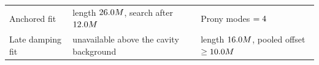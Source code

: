 \documentclass[
  aps,
  prd,
  reprint,
  superscriptaddress,
  nofootinbib,
  longbibliography
]{revtex4-2}
\begin{document}
\begin{table}
\begin{tabular}{lll}
    Anchored fit & length $26.0 M$, search after
      $12.0 M$
      & Prony modes $=4$ \\
    Late damping fit & unavailable above the cavity background
      & length $16.0 M$, pooled offset
        $\geq10.0 M$ \\
    \bottomrule
  \end{tabular}
\end{table}

\clearpage


\end{document}
